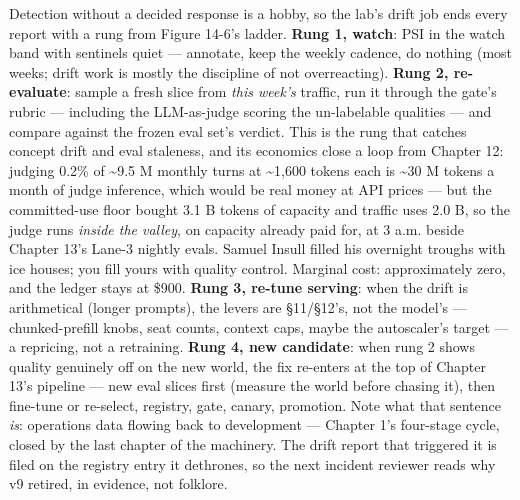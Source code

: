 Detection without a decided response is a hobby, so the lab’s drift job ends every report with a rung from Figure 14-6’s ladder. \textbf{Rung 1, watch}: PSI in the watch band with sentinels quiet — annotate, keep the weekly cadence, do nothing (most weeks; drift work is mostly the discipline of not overreacting). \textbf{Rung 2, re-evaluate}: sample a fresh slice from \textit{this week’s} traffic, run it through the gate’s rubric — including the LLM-as-judge scoring the un-labelable qualities — and compare against the frozen eval set’s verdict. This is the rung that catches concept drift and eval staleness, and its economics close a loop from Chapter 12: judging 0.2\% of \textasciitilde{}9.5 M monthly turns at \textasciitilde{}1,600 tokens each is \textasciitilde{}30 M tokens a month of judge inference, which would be real money at API prices — but the committed-use floor bought 3.1 B tokens of capacity and traffic uses 2.0 B, so the judge runs \textit{inside the valley}, on capacity already paid for, at 3 a.m. beside Chapter 13’s Lane-3 nightly evals. Samuel Insull filled his overnight troughs with ice houses; you fill yours with quality control. Marginal cost: approximately zero, and the ledger stays at \$900. \textbf{Rung 3, re-tune serving}: when the drift is arithmetical (longer prompts), the levers are §11/§12’s, not the model’s — chunked-prefill knobs, seat counts, context caps, maybe the autoscaler’s target — a repricing, not a retraining. \textbf{Rung 4, new candidate}: when rung 2 shows quality genuinely off on the new world, the fix re-enters at the top of Chapter 13’s pipeline — new eval slices first (measure the world before chasing it), then fine-tune or re-select, registry, gate, canary, promotion. Note what that sentence \textit{is}: operations data flowing back to development — Chapter 1’s four-stage cycle, closed by the last chapter of the machinery. The drift report that triggered it is filed on the registry entry it dethrones, so the next incident reviewer reads why v9 retired, in evidence, not folklore.

